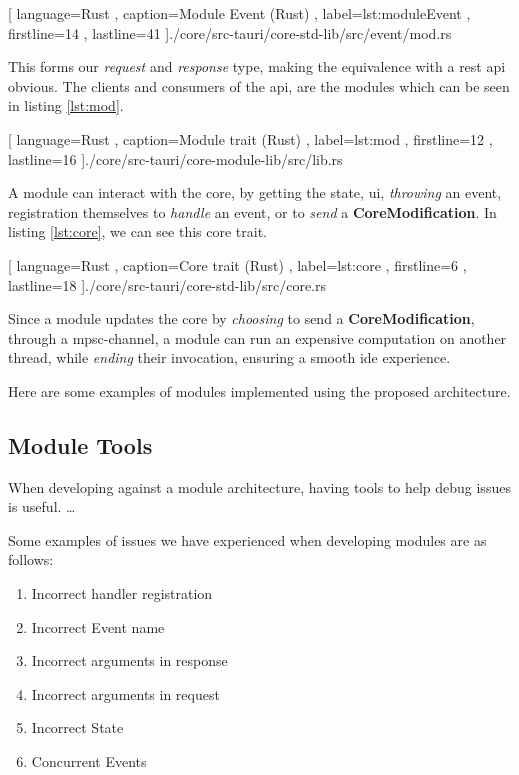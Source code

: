 \begin{center}
  
    [ language=Rust
    , caption={Module Event (Rust)}
    , label=lst:moduleEvent
    , firstline=14
    , lastline=41
    ]{./core/src-tauri/core-std-lib/src/event/mod.rs}
\end{center}

This forms our \textit{request} and \textit{response} type, making the
equivalence with a \gls{rest} \gls{api} obvious. The clients and consumers
of the \gls{api}, are the modules which can be seen in listing \ref{lst:mod}.

\begin{center}
  
    [ language=Rust
    , caption={Module trait (Rust)}
    , label=lst:mod
    , firstline=12
    , lastline=16
    ]{./core/src-tauri/core-module-lib/src/lib.rs}
\end{center}

A module can interact with the core, by getting the state, \gls{ui},
\textit{throwing} an event, registration themselves to \textit{handle} an
event, or to \textit{send} a \textbf{CoreModification}. In listing
\ref{lst:core}, we can see this core trait.

\begin{center}
  
    [ language=Rust
    , caption={Core trait (Rust)}
    , label=lst:core
    , firstline=6
    , lastline=18
    ]{./core/src-tauri/core-std-lib/src/core.rs}
\end{center}

Since a module updates the core by \textit{choosing} to send a
\textbf{CoreModification}, through a \gls{mpsc}-channel, a module can run an
expensive computation on another thread, while \textit{ending} their
invocation, ensuring a smooth \gls{ide} experience.

Here are some examples of modules implemented using the proposed architecture.


\subsection{Module Tools}

When developing against a module architecture, having tools to help debug issues
is useful. \dots

Some examples of issues we have experienced when developing modules are as
follows:

\begin{enumerate}
  \item Incorrect handler registration
  \item Incorrect Event name
  \item Incorrect arguments in response
  \item Incorrect arguments in request
  \item Incorrect State
  \item Concurrent Events
\end{enumerate}

